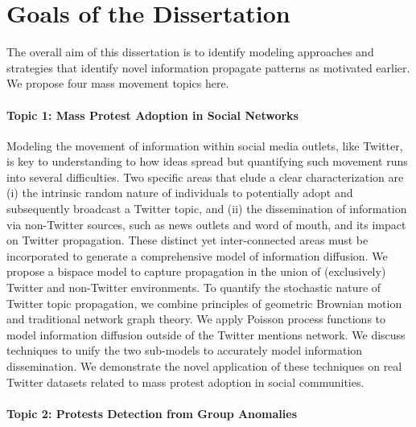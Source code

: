 \section{Goals of the Dissertation}
The overall aim of this dissertation is to identify modeling approaches and strategies that identify
novel information propagate patterns as motivated earlier. We propose
four mass movement topics here.

\paragraph{Topic 1: Mass Protest Adoption in Social Networks}

Modeling the movement of information within social media outlets, like
Twitter, is key to understanding to how ideas spread but quantifying such
movement runs into several difficulties. Two specific areas that elude a clear
characterization are (i) the intrinsic random nature of individuals to
potentially adopt and subsequently broadcast a Twitter topic, and (ii) the
dissemination of information via non-Twitter sources, such as news outlets
and word of mouth, and its impact on Twitter propagation. These distinct
yet inter-connected areas must be incorporated to generate a
comprehensive model of information diffusion. We propose a bispace model
to capture propagation in the union of (exclusively) Twitter and
non-Twitter environments. To quantify the stochastic nature of Twitter
topic propagation, we combine principles of geometric Brownian motion and
traditional network graph theory. We apply Poisson process functions to model
information diffusion outside of the Twitter mentions network. We discuss techniques
to unify the two sub-models to accurately model information dissemination. We
demonstrate the novel application of these techniques on real
Twitter datasets related to mass protest adoption in social communities.

\paragraph{Topic 2: Protests Detection from Group Anomalies}


